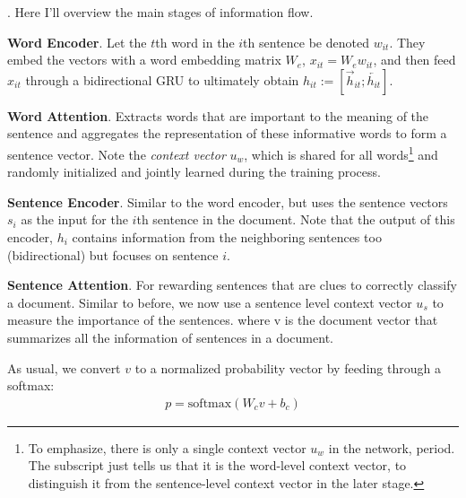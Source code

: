 \documentclass[11pt]{article}
\newcommand\myspace[1][]{\vspace{#1\bigskipamount}}
\newcommand\p{\Needspace{10\baselineskip} \noindent}
\begin{document}
\myspace
\p {}. Here I'll overview the main stages of information flow.
\begin{compactenum}
	\item \textbf{Word Encoder}. Let the $t$th word in the $i$th sentence be denoted $w_{it}$. They embed the vectors with a word embedding matrix $W_e$, $x_{it} = W_e w_{it}$, and then feed $x_{it}$ through a bidirectional GRU to ultimately obtain $h_{it} := [\overrightarrow h_{it}; \overleftarrow{h_{it}}]$.
	
	\item \textbf{Word Attention}. Extracts words that are important to the meaning of the sentence and aggregates the representation of these informative words to form a sentence vector. 
	Note the \textit{context vector} $u_w$, which is shared for all words\footnote{To emphasize, there is only a single context vector $u_w$ in the network, period. The subscript just tells us that it is the word-level context vector, to distinguish it from the sentence-level context vector in the later stage.} and randomly initialized and jointly learned during the training process. 
	
	\item \textbf{Sentence Encoder}. Similar to the word encoder, but uses the sentence vectors $s_i$ as the input for the $i$th sentence in the document. Note that the output of this encoder, $h_i$ contains information from the neighboring sentences too (bidirectional) but focuses on sentence $i$. 
	
	\item \textbf{Sentence Attention}. For rewarding sentences that are clues to correctly classify a document. Similar to before, we now use a sentence level context vector $u_s$ to measure the importance of the sentences.
	where v is the document vector that summarizes all the information of sentences in a document.
\end{compactenum}

As usual, we convert $v$ to a normalized probability vector by feeding through a softmax:
\begin{align}
p = \text{softmax}(W_c v + b_c)
\end{align}
\end{document}
